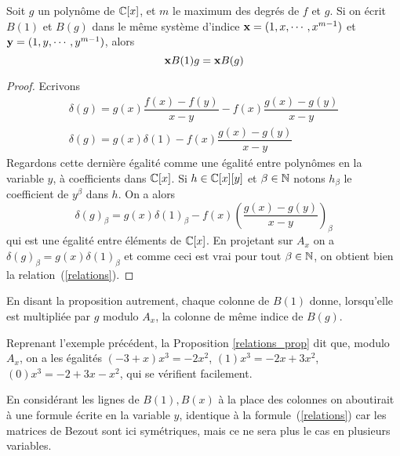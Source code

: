 \documentclass{standalone}
\begin{document}
\begin{prop}
\label{relations_prop}
Soit $g$ un polynôme de $\mathbb{C}[x]$, et $m$ le maximum des degrés de $f$ et $g$. Si on écrit $B(1)$ et $B(g)$ dans le même système d'indice $\bold{x} = (1, x,\cdots, x^{m-1})$ et $\bold{y} = (1, y,\cdots, y^{m-1})$, alors
\begin{equation}
\label{relations}
	\bold{x}B(1)g = \bold{x}B(g)
\end{equation}
\end{prop}
\begin{proof}
Ecrivons
\begin{align} \nonumber
	\delta(g) = g(x)\dfrac{f(x)-f(y)}{x-y} - f(x)\dfrac{g(x)-g(y)}{x-y} \\ \nonumber
	\delta(g) = g(x)\delta(1) - f(x)\dfrac{g(x)-g(y)}{x-y}
\end{align}
Regardons cette dernière égalité comme une égalité entre polynômes en la variable $y$, à coefficients dans $\mathbb{C}[x]$. Si $h\in \mathbb{C}[x][y]$ et $\beta\in\mathbb{N}$ notons $h_\beta$ le coefficient de $y^\beta$ dans $h$. On a alors
$$\delta(g)_\beta = g(x)\delta(1)_\beta - f(x)(\dfrac{g(x)-g(y)}{x-y})_\beta $$
qui est une égalité entre éléments de $\mathbb{C}[x]$. En projetant sur $A_x$ on a
$\delta(g)_\beta = g(x)\delta(1)_\beta$
et comme ceci est vrai pour tout $\beta\in\mathbb{N}$, on obtient bien la relation~(\ref{relations}).
\end{proof}

\begin{rem}
En disant la  proposition autrement, chaque colonne de $B(1)$ donne, lorsqu'elle est multipliée par $g$ modulo $A_x$, la colonne de même indice de $B(g)$.
\end{rem}

\begin{exmp}
Reprenant l'exemple précédent, la Proposition \ref{relations_prop} dit que, modulo $A_x$, on a les égalités $(-3 + x)x^3 = -2x^2$, $(1)x^3 = -2x + 3x^2$, $(0)x^3 = -2 + 3x - x^2$, qui se vérifient facilement.
\end{exmp}

\begin{rem}
En considérant les lignes de $B(1), B(x)$ à la place des colonnes on aboutirait à une formule écrite en la variable $y$, identique à la formule~(\ref{relations}) car les matrices de Bezout sont ici symétriques, mais ce ne sera plus le cas en plusieurs variables.
\end{rem}

\end{document}
